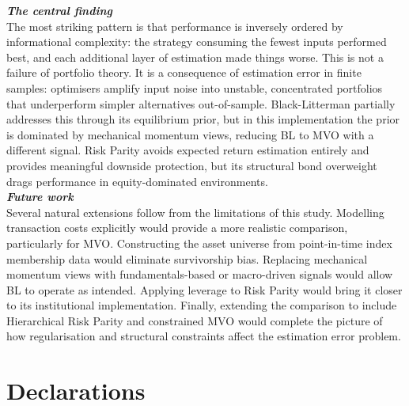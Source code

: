 \documentclass[a4paper,alpha-refs]{scr-contemporary}
\numberwithin{equation}{section}
\begin{document}
\noindent\textbf{\emph{The central finding}} \\
\indent The most striking pattern is that performance is inversely ordered by
informational complexity: the strategy consuming the fewest inputs performed best,
and each additional layer of estimation made things worse. \newline
\indent This is not a failure of portfolio theory. It is a consequence of estimation 
error in finite samples: optimisers amplify input noise into unstable, concentrated portfolios that underperform
simpler alternatives out-of-sample. \newline 
\indent Black-Litterman partially addresses this through
its equilibrium prior, but in this implementation the prior is dominated by mechanical
momentum views, reducing BL to MVO with a different signal. \newline 
\indent Risk Parity avoids expected return estimation entirely and provides 
meaningful downside protection, but its structural bond overweight drags 
performance in equity-dominated environments. \\

\noindent\textbf{\emph{Future work}} \\
\indent Several natural extensions follow from the limitations of this study. \newline 
\indent Modelling transaction costs explicitly would provide a more realistic comparison, 
particularly for MVO. \newline 
\indent Constructing the asset universe from point-in-time index membership data
would eliminate survivorship bias. Replacing mechanical momentum views with
fundamentals-based or macro-driven signals would allow BL to operate as intended. \newline
\indent Applying leverage to Risk Parity would bring it closer to its institutional
implementation. \newline 
\indent Finally, extending the comparison to include Hierarchical Risk Parity
and constrained MVO would complete the picture of how regularisation and structural
constraints affect the estimation error problem.

\section{Declarations}
\end{document}
